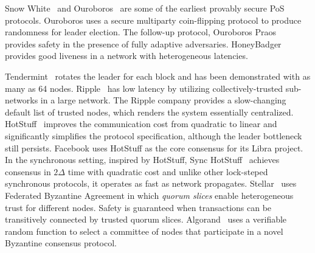 {Snow White~\cite{cryptoeprint:2016:919} and
Ouroboros~\cite{KiayiasRDO17} are some of the earliest provably secure PoS
protocols.  Ouroboros uses a secure multiparty coin-flipping protocol to
produce randomness for leader election. The follow-up protocol, Ouroboros
Praos~\cite{DavidGKR18} provides safety in the presence of fully adaptive
adversaries.
HoneyBadger~\cite{MillerXCSS16} provides good liveness in a network with heterogeneous latencies. %

Tendermint~\cite{buchman2016tendermint, 1807.04938} rotates the leader for each block
and has been demonstrated with as many as 64 nodes. Ripple~\cite{schwartz2014ripple} has low latency by utilizing collectively-trusted
sub-networks in a large network. The Ripple company provides a
slow-changing default list of trusted nodes, which renders the system essentially centralized.
HotStuff~\cite{hotstuff,hotstuffpodc} improves the communication cost from quadratic to linear and significantly simplifies the protocol specification, although the leader bottleneck still persists. Facebook uses HotStuff as the core consensus for its Libra project.
In the synchronous setting, inspired by HotStuff, Sync HotStuff~\cite{synchotstuff} achieves consensus in $2\Delta$ time with quadratic cost and unlike other lock-steped synchronous protocols, it operates as fast as network propagates.
Stellar~\cite{mazieres2015stellar} uses Federated Byzantine Agreement in which \emph{quorum slices}
enable heterogeneous trust for different nodes.  Safety is guaranteed when
transactions can be transitively connected by trusted quorum slices.
Algorand~\cite{GiladHMVZ17} uses a verifiable random function to select a
committee of nodes that participate in a novel Byzantine consensus
protocol.

}
